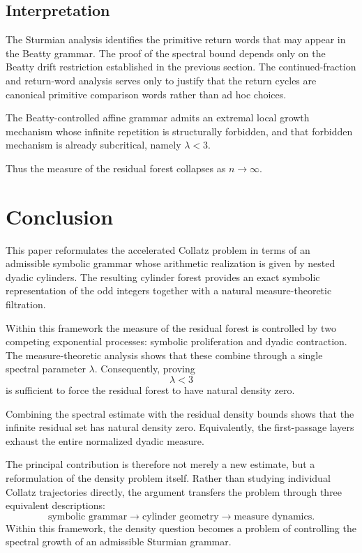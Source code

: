 \documentclass[12pt, oneside]{article}
\numberwithin{equation}{section}
\theoremstyle{definition}
\theoremstyle{plain}
\theoremstyle{remark}
\begin{document}
\subsection{Interpretation}

The Sturmian analysis identifies the primitive return words that may appear
in the Beatty grammar. The proof of the spectral bound depends only on the Beatty
drift restriction established in the previous section. The continued-fraction and
return-word analysis serves only to justify that the return cycles are canonical
primitive comparison words rather than ad hoc choices.

The Beatty-controlled affine grammar admits an extremal local growth mechanism
whose infinite repetition is structurally forbidden, and that forbidden mechanism
is already subcritical, namely \(\lambda < 3\).

Thus the measure of the residual forest collapses as \(n \to \infty\).


\section{Conclusion}

This paper reformulates the accelerated Collatz problem in terms of an admissible symbolic grammar whose
arithmetic realization is given by nested dyadic cylinders. The resulting cylinder forest provides an exact
symbolic representation of the odd integers together with a natural measure-theoretic filtration.

Within this framework the measure of the residual forest is controlled by two competing
exponential processes: symbolic proliferation and dyadic contraction. The measure-theoretic
analysis shows that these combine through a single spectral parameter $\lambda$. Consequently, proving
\[
\lambda < 3
\]
is sufficient to force the residual forest to have natural density zero.

Combining the spectral estimate with the residual density bounds shows that the
infinite residual set has natural density zero. Equivalently, the first-passage
layers exhaust the entire normalized dyadic measure.

The principal contribution is therefore not merely a new estimate, but a reformulation
of the density problem itself. Rather than studying individual Collatz trajectories
directly, the argument transfers the problem through three equivalent descriptions:
\[
\text{symbolic grammar} \longrightarrow \text{cylinder geometry} \longrightarrow \text{measure dynamics}.
\]
Within this framework, the density question becomes a problem of controlling the spectral
growth of an admissible Sturmian grammar.
\end{document}

